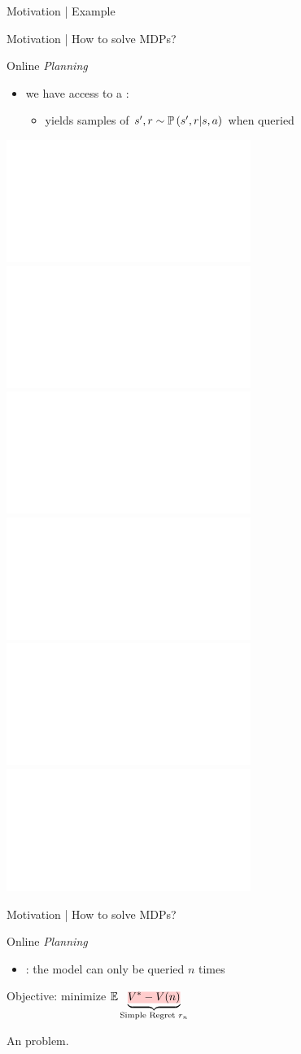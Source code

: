 \documentclass{beamer}
\newcommand{\vcenteredinclude}[2]{\begingroup
\setbox0=\hbox{}%
\parbox{\wd0}{\box0}\endgroup}
\begin{document}
\begin{frame}{Motivation | Example}
\end{frame}

\begin{frame}{Motivation | How to solve MDPs?}
\begin{exampleblock}{Online \emph{Planning}}
\begin{itemize}
    \item we have access to a : 
    \begin{itemize}
        \item[\incarrow] yields samples of $s', r \sim \mathbb{P}\left(s',r|s,a\right)$ when queried
    \end{itemize}
\end{itemize}
\begin{center}
    \includegraphics<1>[trim=0 25 0 50,clip, width=0.7\linewidth]{img/diagram2.pdf}
    \includegraphics<2>[trim=0 25 0 50,clip, width=0.7\linewidth]{img/diagram3.pdf}
    \includegraphics<3>[trim=0 25 0 50,clip, width=0.7\linewidth]{img/diagram4.pdf}
    \includegraphics<4>[trim=0 25 0 50,clip, width=0.7\linewidth]{img/diagram5.pdf}
    \includegraphics<5>[trim=0 25 0 50,clip, width=0.7\linewidth]{img/diagram6.pdf}
    \includegraphics<6>[trim=0 25 0 50,clip, width=0.7\linewidth]{img/diagram7.pdf}
\end{center}
\end{exampleblock}
\end{frame}

\begin{frame}{Motivation | How to solve MDPs?}
\begin{exampleblock}{Online \emph{Planning}}
\begin{itemize}
    \item {}: the model can only be queried $n$ times
\end{itemize}
\begin{center}
Objective: minimize $\expectedvalue \underbrace{\hler{V^* - V(n)}}_{\text{Simple Regret }r_n}$
\end{center}
\begin{flushright}
An  problem.
\end{flushright}
\end{exampleblock}
\end{frame}
\end{document}
